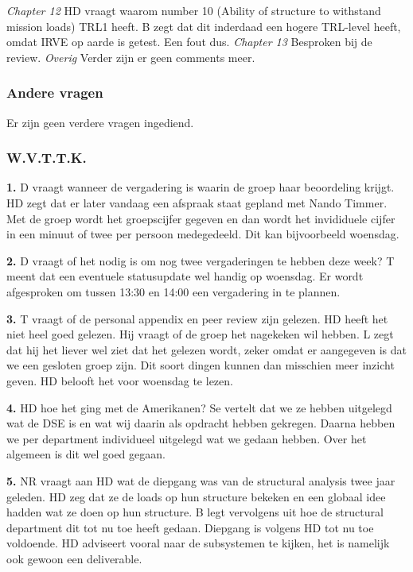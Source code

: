 \newline\newline
\textit{Chapter 12}\newline
HD vraagt waarom number 10 (Ability of structure to withstand mission loads) TRL1 heeft. B zegt dat dit inderdaad een hogere TRL-level heeft, omdat IRVE op aarde is getest. Een fout dus.
\newline\newline
\textit{Chapter 13}\newline
Besproken bij de review.
\newline\newline
\textit{Overig}\newline
Verder zijn er geen comments meer. 
\subsubsection{Andere vragen}
Er zijn geen verdere vragen ingediend.

\subsubsection{W.V.T.T.K.}

\textbf{1.} D vraagt wanneer de vergadering is waarin de groep haar beoordeling krijgt. HD zegt dat er later vandaag een afspraak staat gepland met Nando Timmer. Met de groep wordt het groepscijfer gegeven en dan wordt het invididuele cijfer in een minuut of twee per persoon medegedeeld. Dit kan bijvoorbeeld woensdag.

\textbf{2.} D vraagt of het nodig is om nog twee vergaderingen te hebben deze week? T meent dat een eventuele statusupdate wel handig op woensdag. Er wordt afgesproken om tussen 13:30 en 14:00 een vergadering in te plannen.

\textbf{3.} T vraagt of de personal appendix en peer review zijn gelezen. HD heeft het niet heel goed gelezen. Hij vraagt of de groep het nagekeken wil hebben. L zegt dat hij het liever wel ziet dat het gelezen wordt, zeker omdat er aangegeven is dat we een gesloten groep zijn. Dit soort dingen kunnen dan misschien meer inzicht geven. HD belooft het voor woensdag te lezen.

\textbf{4.} HD hoe het ging met de Amerikanen? Se vertelt dat we ze hebben uitgelegd wat de DSE is en wat wij daarin als opdracht hebben gekregen. Daarna hebben we per department individueel uitgelegd wat we gedaan hebben. Over het algemeen is dit wel goed gegaan.

\textbf{5.} NR vraagt aan HD wat de diepgang was van de structural analysis twee jaar geleden. HD zeg dat ze de loads op hun structure bekeken en een globaal idee hadden wat ze doen op hun structure. B legt vervolgens uit hoe de structural department dit tot nu toe heeft gedaan. Diepgang is volgens HD tot nu toe voldoende. HD adviseert vooral naar de subsystemen te kijken, het is namelijk ook gewoon een deliverable.

